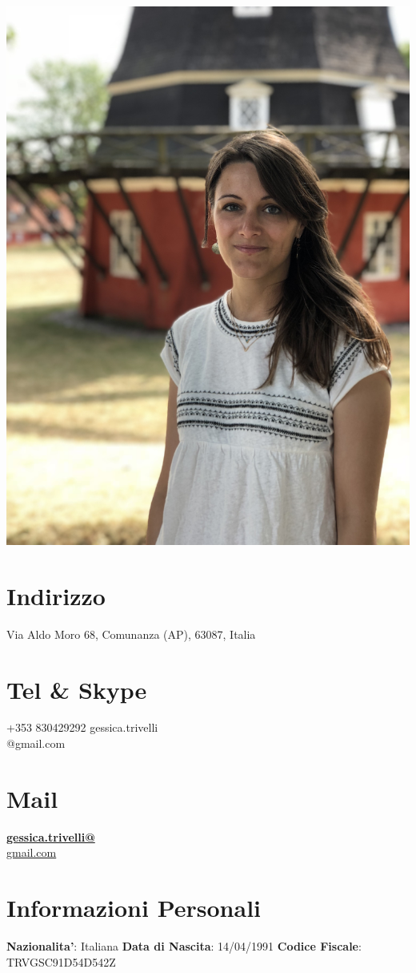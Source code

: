 \documentclass[11pt]{friggeri-cv}
\begin{document}

\begin{aside}
  \includegraphics[width=0.95\columnwidth]{img/IMG_2838}
  \section{Indirizzo}
    Via Aldo Moro 68,
    Comunanza (AP), 63087, Italia
  \section{Tel \& Skype}
    +353 830429292\vspace{3pt}
    gessica.trivelli\\@gmail.com
  \section{Mail}
    \href{mailto:gessica.trivelli@gmail.com}{\textbf{gessica.trivelli@}\\gmail.com}
  \section{Informazioni Personali}
    \textbf{Nazionalita'}: 
    Italiana
    \textbf{Data di Nascita}: 14/04/1991
    \textbf{Codice Fiscale}: TRVGSC91D54D542Z
\end{aside}
\end{document}
